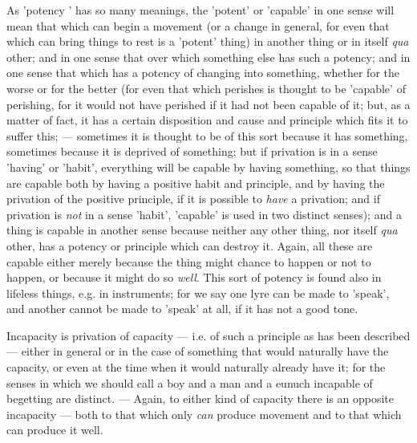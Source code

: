 As 'potency ' has so many meanings, the 'potent' or 'capable' in one sense will mean that which can begin a movement (or a change in general, for even that which can bring things to rest is a 'potent' thing) in another thing or in itself \emph{qua} other; and in one sense that over which something else has such a potency; and in one sense that which has a potency of changing into something, whether for the worse or for the better (for even that which perishes is thought to be 'capable' of perishing, for it would not have perished if it had not been capable of it; but, as a matter of fact, it has a certain disposition and cause and principle which fits it to suffer this; — sometimes it is thought to be of this sort because it has something, sometimes because it is deprived of something; but if privation is in a sense 'having' or 'habit', everything will be capable by having something, so that things are capable both by having a positive habit and principle, and by having the privation of the positive principle, if it is possible to \emph{have} a privation; and if privation is \emph{not} in a sense 'habit', 'capable' is used in two distinct senses); and a thing is capable in another sense because neither any other thing, nor itself \emph{qua} other, has a potency or principle which can destroy it. Again, all these are capable either merely because the thing might chance to happen or not to happen, or because it might do so \emph{well}. This sort of potency is found also in lifeless things, e.g. in instruments; for we say one lyre can be made to 'speak', and another cannot be made to 'speak' at all, if it has not a good tone.

Incapacity is privation of capacity — i.e. of such a principle as has been described — either in general or in the case of something that would naturally have the capacity, or even at the time when it would naturally already have it; for the senses in which we should call a boy and a man and a eunuch incapable of begetting are distinct. — Again, to either kind of capacity there is an opposite incapacity — both to that which only \emph{can} produce movement and to that which can produce it well.

